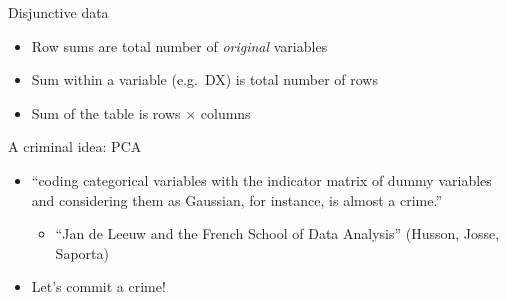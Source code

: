 \documentclass[
  ignorenonframetext,
]{beamer}
\providecommand{\tightlist}{%
  \setlength{\itemsep}{0pt}\setlength{\parskip}{0pt}}
\begin{document}
\begin{frame}{Disjunctive data}
\protect\hypertarget{disjunctive-data-1}{}

\begin{table}[H]
\centering
{}
\end{table}

\begin{itemize}[<+->]
\tightlist
\item
  Row sums are total number of \emph{original} variables
\item
  Sum within a variable (e.g.~DX) is total number of rows
\item
  Sum of the table is rows \(\times\) columns
\end{itemize}

\end{frame}

\begin{frame}{A criminal idea: PCA}
\protect\hypertarget{a-criminal-idea-pca}{}

\begin{itemize}[<+->]
\tightlist
\item
  ``coding categorical variables with the indicator matrix of dummy
  variables and considering them as Gaussian, for instance, is almost a
  crime.''

  \begin{itemize}[<+->]
  \tightlist
  \item
    ``Jan de Leeuw and the French School of Data Analysis'' (Husson,
    Josse, Saporta)
  \end{itemize}
\item
  Let's commit a crime!
\end{itemize}

\end{frame}
\end{document}
